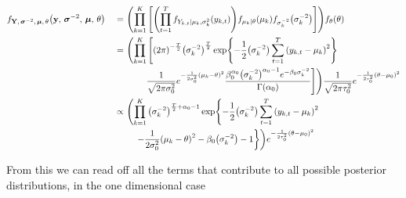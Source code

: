 \documentclass[11pt]{article} %
\let\originalleft\left
\let\originalright\right
\renewcommand{\left}{\mathopen{}\mathclose\bgroup\originalleft}
\renewcommand{\right}{\aftergroup\egroup\originalright}
\begin{document}
\begin{alignat*}{2}
	& f_{\mathbf{Y},\,\boldsymbol{\sigma}^{-2},\,\boldsymbol{\mu},\,\theta}\left(\mathbf{y},\,\boldsymbol{\sigma}^{-2},\,\boldsymbol{\mu},\,\theta\right) &\ =\ &
	\left(\prod_{k=1}^{K}{\left[\left(\prod_{t=1}^{T}{ f_{Y_{k,t} \vert \mu_k, \sigma_{k}^2}\left(y_{k, t}\right)}\right) f_{\mu_k\vert \theta}\left(\mu_{k}\right)  f_{\sigma_{k}^{-2}}\left(\sigma_{k}^{-2}\right) \right]}\right) f_{\theta}\left(\theta\right)\\
	& &\ =\ &  \left(\prod_{k=1}^{K}{\left[\left(2\pi\right)^{-\frac{T}{2}}\left(\sigma_k^{-2}\right)^{\frac{T}{2}}\exp\left\{ -\frac{1}{2}\left(\sigma_k^{-2}\right) \sum_{t=1}^{T}{\left(y_{k, t} - \mu_k\right)^2} \right\}\right.}\right. \\
	&&&  \qquad\left.{\left.\frac{1}{\sqrt{2\pi\sigma_0^2}}e^{-\frac{1}{2\sigma_0^{2}}\left(\mu_{k} - \theta\right)^2}  \frac{\beta_0^{\alpha_0}{\left(\sigma_{k}^{-2}\right)}^{\alpha_0 - 1}e^{-\beta_0{\sigma_{k}^{-2}}}}{\Gamma\left(\alpha_0\right)}\right]}\right)   \frac{1}{\sqrt{2\pi\tau_0^2}}e^{-\frac{1}{2\tau_0^{2}}\left(\theta - \mu_{0}\right)^2} \\
	& &\ \propto\ &  \left(\prod_{k=1}^{K}{\left(\sigma_k^{-2}\right)^{\frac{T}{2} + \alpha_0 -1}\exp\left\{-\frac{1}{2}\left(\sigma_k^{-2}\right) \sum_{t=1}^{T}{\left(y_{k, t} - \mu_k\right)^2} \right.}\right.\\
	&&& \quad\left.{\left.-\frac{1}{2\sigma_0^{2}}\left(\mu_{k} - \theta\right)^2 - \beta_0\left(\sigma_k^{-2}\right) - 1\right\}}\right)e^{-\frac{1}{2\tau_0^{2}}\left(\theta - \mu_{0}\right)^2}
\end{alignat*}

From this we can read off all the terms that contribute to all possible posterior distributions, in the one dimensional case
\end{document}
